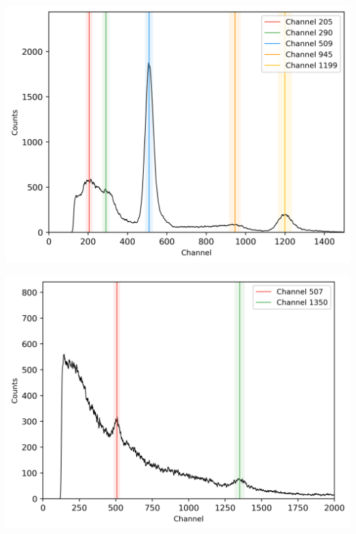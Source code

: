 \begin{multicols}{2}
\begin{center}
\begin{adjustbox}{max width=\linewidth, keepaspectratio}
        \end{adjustbox}
        \label{fig:Spectrum133Ba}
    \end{center}
\endminipage
%
\vspace{10mm}
%
\minipage{\linewidth}
    \begin{center}
        \captionsetup{type=figure}
        \begin{adjustbox}{max width=\linewidth, keepaspectratio}
            \includegraphics[]{png/22Na}
        \end{adjustbox}
        \label{fig:Spectrum22Na}
    \end{center}
\endminipage
%
\vspace{10mm}
%
\minipage{\linewidth}
    \begin{center}
        \captionsetup{type=figure}
        \begin{adjustbox}{max width=\linewidth, keepaspectratio}
            \includegraphics[]{png/night}

\end{adjustbox}
\end{center}
\end{multicols}
